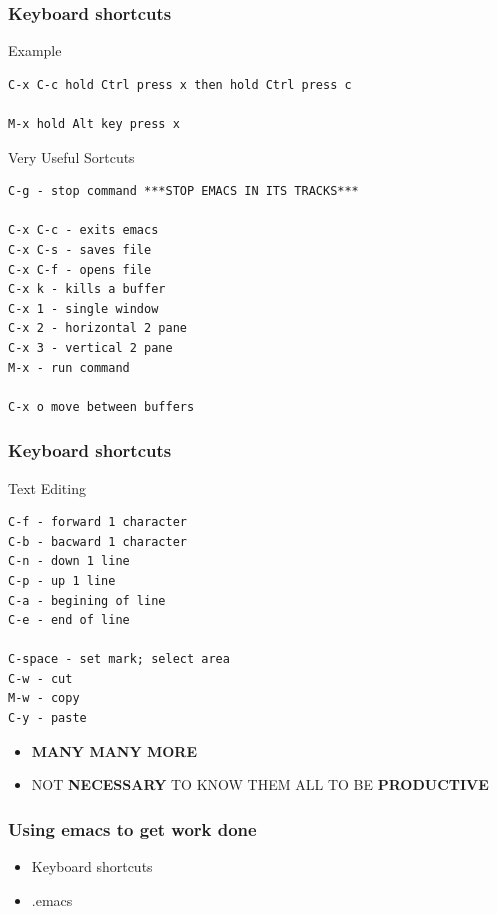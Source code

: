 \documentclass[t,10pt]{beamer}
\begin{document}
\begin{frame}[fragile]
\frametitle{Keyboard shortcuts}
\label{sec-2-3}
\begin{exampleblock}{Example}
\label{sec-2-3-1}


\begin{verbatim}
C-x C-c hold Ctrl press x then hold Ctrl press c

M-x hold Alt key press x
\end{verbatim}
\end{exampleblock}
\begin{exampleblock}{Very Useful Sortcuts}
\label{sec-2-3-2}


\begin{verbatim}
C-g - stop command ***STOP EMACS IN ITS TRACKS***

C-x C-c - exits emacs
C-x C-s - saves file
C-x C-f - opens file
C-x k - kills a buffer
C-x 1 - single window
C-x 2 - horizontal 2 pane
C-x 3 - vertical 2 pane
M-x - run command

C-x o move between buffers
\end{verbatim}
  
\end{exampleblock}
\end{frame}
\begin{frame}[fragile]
\frametitle{Keyboard shortcuts}
\label{sec-2-4}
\begin{exampleblock}{Text Editing}
\label{sec-2-4-1}


\begin{verbatim}
C-f - forward 1 character
C-b - bacward 1 character
C-n - down 1 line
C-p - up 1 line
C-a - begining of line
C-e - end of line

C-space - set mark; select area
C-w - cut
M-w - copy
C-y - paste
\end{verbatim}
\end{exampleblock}
\begin{itemize}

\item \textbf{MANY MANY MORE}
\label{sec-2-4-2}%

\item NOT \textbf{NECESSARY} TO KNOW THEM ALL TO BE \textbf{PRODUCTIVE}\\
\label{sec-2-4-3}%
\end{itemize} %
\end{frame}
\begin{frame}
\frametitle{Using emacs to get work done}
\label{sec-2-5}

\begin{itemize}
\item Keyboard shortcuts
\end{itemize}
\vspace{0.25in}
\begin{itemize}
\item .emacs
\end{itemize}
\end{frame}
\end{document}

